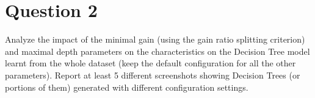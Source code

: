 \section{Question 2}

\begin{question}
        Analyze the impact of the minimal gain (using the gain ratio splitting criterion) and maximal depth
    parameters on the characteristics on the Decision Tree model learnt from the whole dataset (keep
    the default configuration for all the other parameters).
        Report at least 5 different screenshots showing Decision Trees (or portions of them) generated with
    different configuration settings.
\end{question}


\begin{answer}
\end{answer}